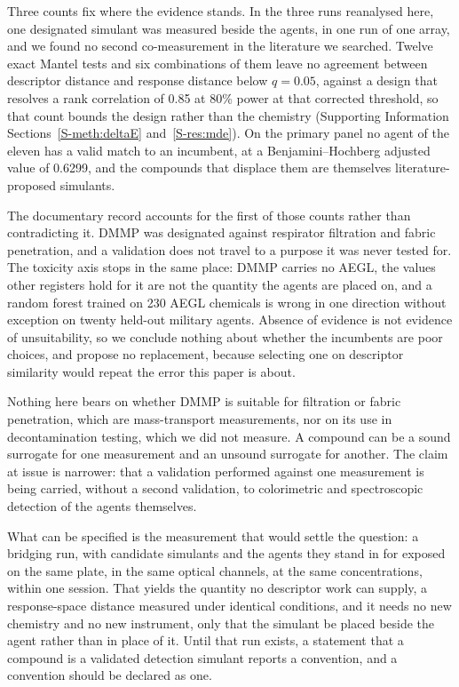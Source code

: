 \documentclass[journal=jacsat,manuscript=article,margin=1in]{achemso}
\begin{document}
Three counts fix where the evidence stands. In the three runs reanalysed here,
one designated simulant was measured beside the agents, in one run of one
array, and we found no second co-measurement in the literature we searched.
Twelve exact Mantel tests and six combinations of them leave no agreement
between descriptor distance and response distance below $q=0.05$, against a
design that resolves a rank correlation of 0.85 at 80\% power at that corrected
threshold, so that count bounds the design rather than the chemistry
(Supporting Information Sections~\ref{S-meth:deltaE} and~\ref{S-res:mde}). On
the primary panel no agent of the eleven has a valid match to an incumbent,
at a Benjamini--Hochberg adjusted value of 0.6299, and the compounds that
displace them are themselves literature-proposed simulants.

The documentary record accounts for the first of those counts rather than
contradicting it. DMMP was designated against respirator filtration and fabric
penetration, and a validation does not travel to a purpose it was never tested
for. The toxicity axis stops in the same place: DMMP carries no AEGL, the
values other registers hold for it are not the quantity the agents are placed
on, and a random forest trained on 230 AEGL chemicals is wrong in one direction
without exception on twenty held-out military agents. Absence of evidence is
not evidence of unsuitability, so we conclude nothing about whether the
incumbents are poor choices, and propose no replacement, because selecting one
on descriptor similarity would repeat the error this paper is about.

Nothing here bears on whether DMMP is suitable for filtration or fabric
penetration, which are mass-transport measurements, nor on its use in
decontamination testing, which we did not measure. A compound can be a sound
surrogate for one measurement and an unsound surrogate for another. The claim
at issue is narrower: that a validation performed against one measurement is
being carried, without a second validation, to colorimetric and spectroscopic
detection of the agents themselves.

What can be specified is the measurement that would settle the question: a
bridging run, with candidate simulants and the agents they stand in for
exposed on the same plate, in the same optical channels, at the same
concentrations, within one session. That yields the quantity no descriptor work
can supply, a response-space distance measured under identical conditions, and
it needs no new chemistry and no new instrument, only that the simulant be
placed beside the agent rather than in place of it. Until that run exists, a
statement that a compound is a validated detection simulant reports a
convention, and a convention should be declared as one.
\end{document}
